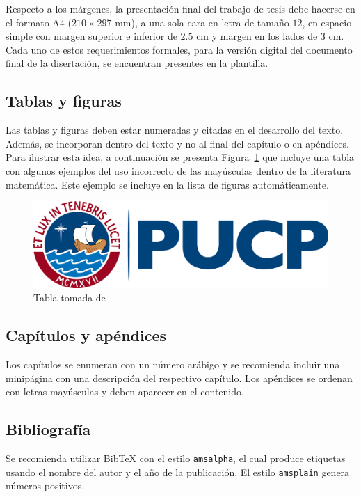 Respecto a los m\'argenes, la presentaci\'on final del trabajo de tesis debe
hacerse en el formato A\(4\) (\(210 \times 297\) mm), a una sola cara en letra
de tama\~no \(12\), en espacio simple con margen superior e inferior de \(2.5\)
cm y margen en los lados de \(3\) cm.
Cada uno de estos requerimientos formales,
para la versi\'on digital del documento final de la disertaci\'on,
se encuentran presentes en la plantilla.

\subsection{Tablas y figuras}
Las tablas y figuras deben estar numeradas y citadas en el desarrollo del
texto. Adem\'as, se incorporan dentro  del texto y no al final del cap\'itulo
o en ap\'endices. Para ilustrar esta idea, a continuaci\'on se presenta
\mbox{Figura \ref{LogoAntiguo}} que incluye una tabla con algunos ejemplos del
uso incorrecto de las may\'usculas dentro de la literatura matem\'atica.
Este ejemplo se incluye en la lista de figuras autom\'aticamente.

\begin{figure}[H]
  \centering
  \includegraphics[width=14.5cm]{images/2020-pucp-logo.png}
  \caption{Tabla tomada de \cite{EW2012}}\label{LogoAntiguo}
\end{figure}

\subsection{Cap\'itulos y ap\'endices}
Los cap\'itulos se enumeran con un n\'umero ar\'abigo y se recomienda incluir
una minip\'agina con una descripci\'on del respectivo cap\'itulo.
Los ap\'endices se ordenan con letras may\'usculas y deben aparecer en el
contenido.

\subsection{Bibliograf\'ia}
Se recomienda utilizar BibTeX con el estilo \texttt{amsalpha},
el cual produce etiquetas usando el nombre del autor y el a\~no de la
publicaci\'on. El estilo \texttt{amsplain} genera números positivos.

